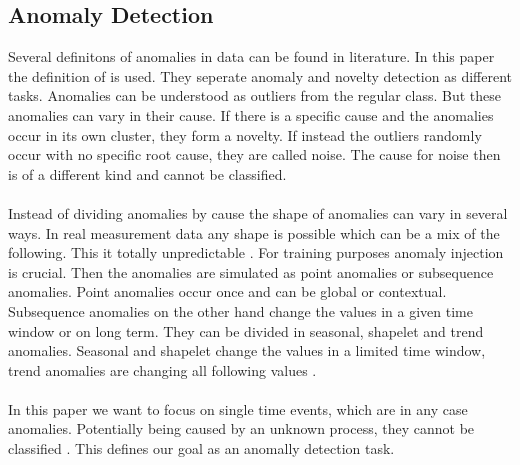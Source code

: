 \subsection{Anomaly Detection}
Several definitons of anomalies in data can be found in literature. In this paper the definition of  is used. They seperate anomaly and novelty detection as different tasks. Anomalies can be understood as outliers from the regular class. But these anomalies can vary in their cause. If there is a specific cause and the anomalies occur in its own cluster, they form a novelty. If instead the outliers randomly occur with no specific root cause, they are called noise. The cause for noise then is of a different kind and cannot be classified.\\\\
Instead of dividing anomalies by cause the shape of anomalies can vary in several ways. In real measurement data any shape is possible which can be a mix of the following. This it totally unpredictable \cite{schwartz_maeday_2024}. For training purposes anomaly injection is crucial. Then the anomalies are simulated as point anomalies or subsequence anomalies. Point anomalies occur once and can be global or contextual. Subsequence anomalies on the other hand change the values in a given time window or on long term. They can be divided in seasonal, shapelet and trend anomalies. Seasonal and shapelet change the values in a limited time window, trend anomalies are changing all following values \cite[p. 9]{darban_carla_2024}.\\\\ %
In this paper we want to focus on single time events, which are in any case anomalies. Potentially being caused by an unknown process, they cannot be classified \cite{gruhl_novelty_2022}. This defines our goal as an anomally detection task.\\

